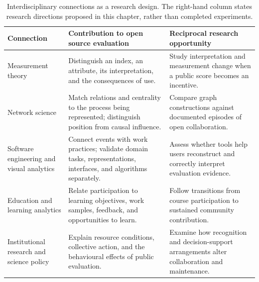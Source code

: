 \begin{table}[htbp]
\caption{Interdisciplinary connections as a research design. The right-hand column states research directions proposed in this chapter, rather than completed experiments.}
\label{tab:ch11-bridges}
\centering\small\renewcommand{\arraystretch}{1.17}
\begin{tabularx}{\linewidth}{@{}>{\raggedright\arraybackslash}p{.24\linewidth}>{\raggedright\arraybackslash}X>{\raggedright\arraybackslash}X@{}}
\toprule
\textbf{Connection} & \textbf{Contribution to open source evaluation} & \textbf{Reciprocal research opportunity}\\\midrule
Measurement theory & Distinguish an index, an attribute, its interpretation, and the consequences of use. & Study interpretation and measurement change when a public score becomes an incentive.\\[6pt]
Network science & Match relations and centrality to the process being represented; distinguish position from causal influence. & Compare graph constructions against documented episodes of open collaboration.\\[6pt]
Software engineering and visual analytics & Connect events with work practices; validate domain tasks, representations, interfaces, and algorithms separately. & Assess whether tools help users reconstruct and correctly interpret evaluation evidence.\\[6pt]
Education and learning analytics & Relate participation to learning objectives, work samples, feedback, and opportunities to learn. & Follow transitions from course participation to sustained community contribution.\\[6pt]
Institutional research and science policy & Explain resource conditions, collective action, and the behavioural effects of public evaluation. & Examine how recognition and decision-support arrangements alter collaboration and maintenance.\\
\bottomrule
\end{tabularx}
\end{table}
